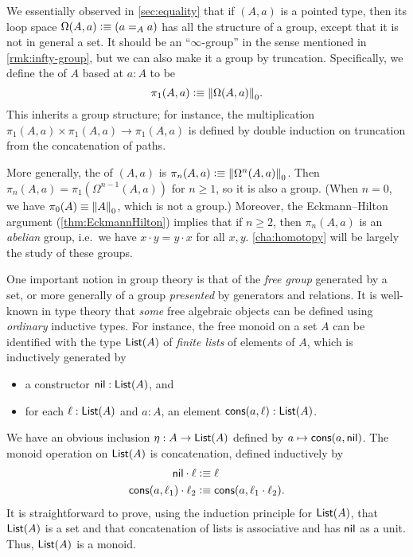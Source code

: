 \begin{eg}\label{thm:homotopy-groups}
  We essentially observed in \autoref{sec:equality} that if $(A,a)$ is a pointed type, then its loop space $\Omega(A,a)\defeq (\id[A]aa)$ has all the structure of a group, except that it is not in general a set.
  It should be an ``$\infty$-group'' in the sense mentioned in \autoref{rmk:infty-group}, but we can also make it a group by truncation.
  Specifically, we define the 
  of $A$ based at $a:A$ to be
  \[\pi_1(A,a)\defeq \trunc0{\Omega(A,a)}.\]
  This inherits a group structure; for instance, the multiplication $\pi_1(A,a) \times \pi_1(A,a) \to \pi_1(A,a)$ is defined by double induction on truncation from the concatenation of paths.

  More generally, the 
  of $(A,a)$ is $\pi_n(A,a)\defeq \trunc0{\Omega^n(A,a)}$.
  Then $\pi_n(A,a) = \pi_1(\Omega^{n-1}(A,a))$ for $n\ge 1$, so it is also a group.
  (When $n=0$, we have $\pi_0(A) \jdeq \trunc0 A$, which is not a group.)
  Moreover, the Eckmann--Hilton argument (\autoref{thm:EckmannHilton}) implies that if $n\ge 2$, then $\pi_n(A,a)$ is an \emph{abelian} group, i.e.\ we have $x\cdot y = y\cdot x$ for all $x,y$.
  \autoref{cha:homotopy} will be largely the study of these groups.
\end{eg}

%
%
One important notion in group theory is that of the \emph{free group} generated by a set, or more generally of a group \emph{presented} by generators and relations.
It is well-known in type theory that \emph{some} free algebraic objects can be defined using \emph{ordinary} inductive types.
%
%
For instance, the free monoid on a set $A$ can be identified with the type $\lst A$ of \emph{finite lists} of elements of $A$, which is inductively generated by
\begin{itemize}
\item a constructor $\nil:\lst A$, and
\item for each $\ell:\lst A$ and $a:A$, an element $\cons(a,\ell):\lst A$.
\end{itemize}
We have an obvious inclusion $\eta : A\to \lst A$ defined by $a\mapsto \cons(a,\nil)$.
The monoid operation on $\lst A$ is concatenation, defined inductively by
\begin{align*}
  \nil \cdot \ell &\defeq \ell\\
  \cons (a,\ell_1) \cdot \ell_2 &\defeq \cons(a, \ell_1\cdot\ell_2).
\end{align*}
It is straightforward to prove, using the induction principle for $\lst A$, that $\lst A$ is a set and that concatenation of lists is associative
%
and has $\nil$ as a unit.
Thus, $\lst A$ is a monoid.

